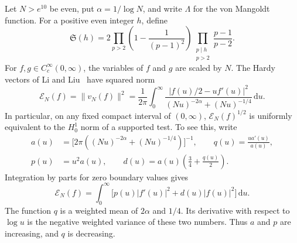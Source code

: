 \documentclass[11pt,a4paper]{article}
\numberwithin{equation}{section}
\newcommand{\SSS}{\mathfrak S}
\newcommand{\ud}{\mathrm d}
\newcommand{\E}{\mathcal E_N}
\begin{document}
Let $N>e^{10}$ be even, put $\alpha=1/\log N$, and write $\Lambda$ for the
von Mangoldt function. For a positive even integer $h$, define
\begin{equation}
  \SSS(h)=2\prod_{p>2}\left(1-\frac{1}{(p-1)^2}\right)
     \prod_{\substack{p\mid h\\p>2}}\frac{p-1}{p-2}.
  \label{eq:series}
\end{equation}
For $f,g\in C_c^\infty(0,\infty)$, the variables of $f$ and $g$ are scaled
by $N$. The Hardy vectors of Li and Liu~\cite[Proposition~7.4]{LiLiu} have
squared norm
\begin{equation}
  \E(f)=\|v_N(f)\|^2
    =\frac{1}{2\pi}\int_0^\infty
      \frac{|f(u)/2-uf'(u)|^2}{(Nu)^{-2\alpha}+(Nu)^{-1/4}}\,\ud u.
  \label{eq:energy}
\end{equation}
In particular, on any fixed compact interval of $(0,\infty)$,
$\E(f)^{1/2}$ is uniformly equivalent to the $H^1_0$ norm of a supported
test. To see this, write
\begin{equation}
\begin{split}
  a(u)&=\bigl[2\pi((Nu)^{-2\alpha}+(Nu)^{-1/4})\bigr]^{-1},
  \qquad q(u)=\frac{u a'(u)}{a(u)},\\
  p(u)&=u^2a(u),\qquad d(u)=a(u)\left(\frac34+\frac{q(u)}2\right).
\end{split}
  \label{eq:coeff}
\end{equation}
Integration by parts for zero boundary values gives
\begin{equation}
  \E(f)=\int_0^\infty \bigl[p(u)|f'(u)|^2+d(u)|f(u)|^2\bigr]\,\ud u.
  \label{eq:sturm}
\end{equation}
The function $q$ is a weighted mean of $2\alpha$ and $1/4$. Its derivative
with respect to $\log u$ is the negative weighted variance of these two
numbers. Thus $a$ and $p$ are increasing, and $q$ is decreasing.
\end{document}
